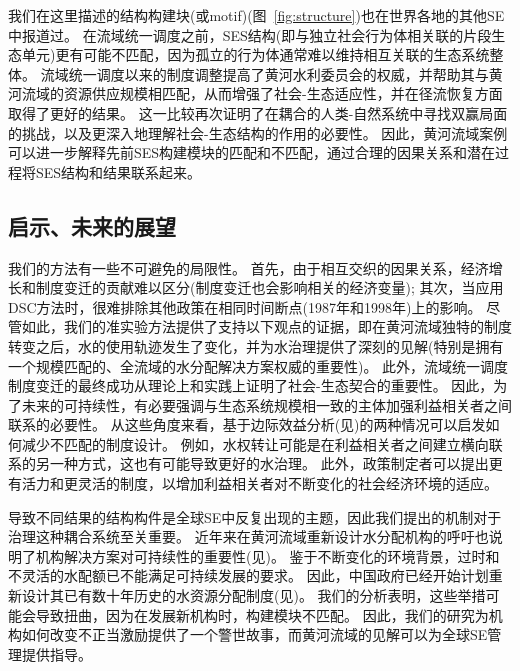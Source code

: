 我们在这里描述的结构构建块(或motif)(图~\ref{fig:structure})也在世界各地的其他SE中报道过。
在流域统一调度之前，SES结构(即与独立社会行为体相关联的片段生态单元)更有可能不匹配，因为孤立的行为体通常难以维持相互关联的生态系统整体\cite{sayles2017,sayles2019,cai2016,bergsten2019}。
流域统一调度以来的制度调整提高了黄河水利委员会的权威，并帮助其与黄河流域的资源供应规模相匹配，从而增强了社会-生态适应性，并在径流恢复方面取得了更好的结果\cite{cumming2020a,wang2019d}。
这一比较再次证明了在耦合的人类-自然系统\cite{hegwood2022}中寻找双赢局面的挑战，以及更深入地理解社会-生态结构\cite{bergsten2019, sayles2019}的作用的必要性。
因此，黄河流域案例可以进一步解释先前SES构建模块的匹配和不匹配，通过合理的因果关系和潜在过程将SES结构和结果联系起来。



\subsection{启示、未来的展望}
我们的方法有一些不可避免的局限性。
首先，由于相互交织的因果关系，经济增长和制度变迁的贡献难以区分(制度变迁也会影响相关的经济变量);
其次，当应用DSC方法时，很难排除其他政策在相同时间断点(1987年和1998年)上的影响。
尽管如此，我们的准实验方法提供了支持以下观点的证据，即在黄河流域独特的制度转变之后，水的使用轨迹发生了变化，并为水治理提供了深刻的见解(特别是拥有一个规模匹配的、全流域的水分配解决方案权威的重要性\cite{bodin2017b, ostrom2009, reyers2018})。
此外，流域统一调度制度变迁的最终成功从理论上和实践上证明了社会-生态契合的重要性。
因此，为了未来的可持续性，有必要强调与生态系统规模相一致的主体加强利益相关者之间联系的必要性。
从这些角度来看，基于边际效益分析(见\textit{})的两种情况可以启发如何减少不匹配的制度设计。
例如，水权转让可能是在利益相关者之间建立横向联系的另一种方式，这也有可能导致更好的水治理。
此外，政策制定者可以提出更有活力和更灵活的制度，以增加利益相关者对不断变化的社会经济环境的适应\cite{reyers2018}。

导致不同结果的结构构件是全球SE中反复出现的主题，因此我们提出的机制对于治理这种耦合系统至关重要。
近年来在黄河流域重新设计水分配机构的呼吁也说明了机构解决方案对可持续性的重要性(见\textit{})。
鉴于不断变化的环境背景，过时和不灵活的水配额已不能满足可持续发展的要求\cite{wang2019a}。
因此，中国政府已经开始计划重新设计其已有数十年历史的水资源分配制度(见\textit{})。
我们的分析表明，这些举措可能会导致扭曲，因为在发展新机构\cite{bodin2017b}时，构建模块不匹配。
因此，我们的研究为机构如何改变不正当激励提供了一个警世故事\cite{hegwood2022}，而黄河流域的见解可以为全球SE管理提供指导\cite{muneepeerakul2017, leslie2015}。
